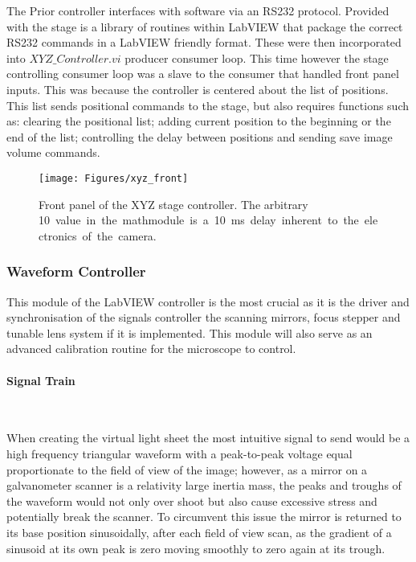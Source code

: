 \documentclass[10pt,a4paper]{report}
\begin{document}
\begin{spacing}{1.5}
The Prior controller interfaces with software via an RS232 protocol. Provided with the stage is a library of routines within LabVIEW that package the correct RS232 commands in a LabVIEW friendly format. These were then incorporated into $XYZ\_Controller.vi$ producer consumer loop. This time however the stage controlling consumer loop was a slave to the consumer that handled front panel inputs. This was because the controller is centered about the list of positions. This list sends positional commands to the stage, but also requires functions such as: clearing the positional list; adding current position to the beginning or the end of the list; controlling the delay between positions and sending save image volume commands.

\begin{figure}
\centering
\texttt{[image: Figures/xyz\_front]}
\caption[XYZ Controller front panel]{Front panel of the XYZ stage controller. The arbitrary \SI{10} value in the mathmodule is a \SI{10}{\milli\second} delay inherent to the electronics of the camera.}
\label{fig:xyz_front}
\end{figure}

\subsubsection{Waveform Controller}

This module of the LabVIEW controller is the most crucial as it is the driver and synchronisation of the signals controller the scanning mirrors, focus stepper and tunable lens system if it is implemented. This module will also serve as an advanced calibration routine for the microscope to control.

\paragraph{Signal Train}~

When creating the virtual light sheet the most intuitive signal to send would be a high frequency triangular waveform with a peak-to-peak voltage equal proportionate to the field of view of the image; however, as a mirror on a galvanometer scanner is a relativity large inertia mass, the peaks and troughs of the waveform would not only over shoot but also cause excessive stress and potentially break the scanner. To circumvent this issue the mirror is returned to its base position sinusoidally, after each field of view scan, as the gradient of a sinusoid at its own peak is zero moving smoothly to zero again at its trough.


\end{spacing}
\end{document}
